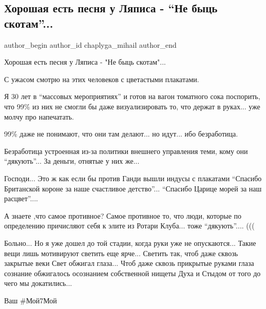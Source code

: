  
 
 
 
 
 
\subsection{Хорошая есть песня у Ляписа - \enquote{Не быць скотам}...}
\label{sec:31_01_2022.fb.chaplyga_mihail.1.ne_byc_skotami}
 
\ifcmt
 author_begin
   author_id chaplyga_mihail
 author_end
\fi

Хорошая есть песня у Ляписа - "Не быць скотам"...

С ужасом смотрю на этих человеков с цветастыми плакатами. 

Я 30 лет в \enquote{массовых мероприятиях} и готов на вагон томатного сока поспорить,
что 99\% из них не смогли бы даже визуализировать то, что держат в руках... уже
молчу про напечатать. 


99\% даже не понимают, что они там делают... но идут... ибо безработица.

Безработица устроенная из-за политики внешнего управления теми, кому они
\enquote{дякують}... За деньги, отнятые у них же...

Господи... Это ж как если бы против Ганди вышли индусы с плакатами \enquote{Спасибо
Британской короне за наше счастливое детство}... \enquote{Спасибо Царице морей за наш
расцвет}....

А знаете ,что самое противное? Самое противное то, что люди, которые по
определению причисляют себя к элите из Ротари Клуба... тоже \enquote{дякують}.... (((

Больно... Но я уже дошел до той стадии, когда руки уже не опускаются... Такие
вещи лишь мотивируют светить еще ярче... Светить так, чтоб даже сквозь закрытые
веки Свет обжигал глаза... Чтоб даже сквозь прикрытые руками глаза сознание
обжигалось осознанием собственной нищеты Духа и Стыдом от того до чего мы
докатились...

Ваш #Мой7Мой
